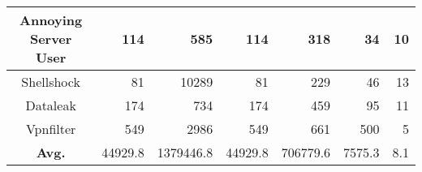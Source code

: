 \begin{table*}[!htb]
{\begin{tabular}{c|r|r|r|r|r|r}
Annoying Server User & 114                                                   & 585                                                   & 114                                           & 318                                           & 34                                         & 10                                         \\ \hline
Shellshock           & 81                                                    & 10289                                                 & 81                                            & 229                                           & 46                                         & 13                                         \\ \hline
Dataleak             & 174                                                   & 734                                                   & 174                                           & 459                                           & 95                                         & 11                                         \\ \hline
Vpnfilter            & 549                                                   & 2986                                                  & 549                                           & 661                                           & 500                                        & 5                                          \\ \hline
\textbf{Avg.}                  & 44929.8                                               & 1379446.8                                             & 44929.8                                       & 706779.6                                      & 7575.3                                     & 8.1                                        \\ \hline
\end{tabular}
}
\end{table*}